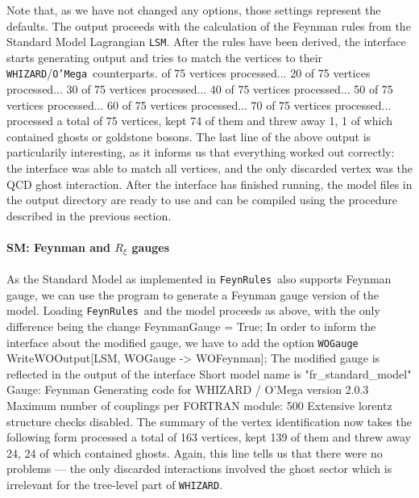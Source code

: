 \documentclass[12pt]{book}
\newenvironment{code}%
  {\begingroup\footnotesize
   \quote
   \Verbatim}%
  {\endVerbatim
   \endquote
   \endgroup\noindent}
\newcommand{\ttt}[1]{\texttt{#1}}
\newcommand{\whizard}{\ttt{WHIZARD}}
\newcommand{\oMega}{\ttt{O'Mega}}
\newcommand{\FeynRules}{\ttt{FeynRules}}
\begin{document}
Note that, as we have not changed any options, those settings represent the
defaults. The output proceeds with the calculation of the Feynman rules from the
Standard Model Lagrangian \verb?LSM?. After the rules have been derived, the
interface starts generating output and tries to match the vertices to
their \whizard/\oMega\ counterparts.
\begin{code}
   10 of 75 vertices processed...
   20 of 75 vertices processed...
   30 of 75 vertices processed...
   40 of 75 vertices processed...
   50 of 75 vertices processed...
   60 of 75 vertices processed...
   70 of 75 vertices processed...
processed a total of 75 vertices, kept 74
   of them and threw away 1, 1 of which
   contained ghosts or goldstone bosons.
\end{code}
The last line of the above output is particularily interesting, as it informs us
that everything worked out correctly: the interface was able to match all
vertices, and the only discarded vertex was the QCD ghost interaction.
After the interface has finished running, the model files in the output
directory are ready to use and can be compiled using the procedure described in
the previous section.


\paragraph{SM: Feynman and $R_\xi$ gauges}

As the Standard Model as implemented in \FeynRules\ also supports Feynman
gauge, we can use the program to generate a Feynman gauge version of the model.
Loading \FeynRules\ and the model proceeds as above, with the only
difference being the change
\begin{code}
FeynmanGauge = True;
\end{code}
In order to inform the interface about the modified gauge, we have to
add the option \verb?WOGauge?
\begin{code}
WriteWOOutput[LSM, WOGauge -> WOFeynman];
\end{code}
The modified gauge is reflected in the output of the interface
\begin{code}
Short model name is "fr_standard_model"
Gauge: Feynman
Generating code for WHIZARD / O'Mega
                        version 2.0.3
Maximum number of couplings per FORTRAN
                           module: 500
Extensive lorentz structure checks disabled.
\end{code}
The summary of the vertex identification now takes the following form
\begin{code}
processed a total of 163 vertices, kept 139
   of them and threw away 24, 24 of which
   contained ghosts.
\end{code}
Again, this line tells us that there were no problems --- the only
discarded interactions involved the ghost sector which is irrelevant
for the tree-level part of \whizard.
\end{document}
